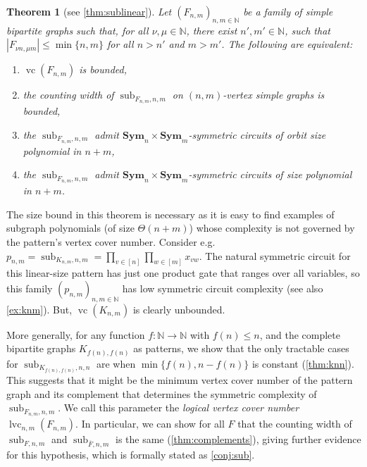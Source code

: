 \documentclass[11pt, DIV=15]{scrarticle}
\theoremstyle{definition}
\theoremstyle{plain}
\newtheorem{theorem}[definition]{Theorem}
\theoremstyle{remark}
\DeclareMathOperator{\sub}{sub}
\DeclareMathOperator{\vc}{vc}
\DeclareMathOperator{\cc}{lvc}
\newcommand{\Sym}{\mathbf{Sym}}
\newcommand{\bbN}{\mathbb{N}}
\begin{document}
\begin{theorem}[see \cref{thm:sublinear}]\label{thm:sublinear-intro}
	Let $(F_{n,m})_{n,m \in \mathbb{N}}$ be a family of simple bipartite graphs such that, 
	for all $\nu, \mu \in \mathbb{N}$,
	there exist $n',m' \in \mathbb{N}$,
	such that $|F_{\nu n, \mu m}| \leq \min \{n,m\}$ for all $n > n'$ and $m > m'$.
	The following are equivalent:
	\begin{enumerate}
		\item $\vc(F_{n,m})$ is bounded,
		\item the counting width of $\sub_{F_{n,m},n,m}$ on $(n,m)$-vertex simple graphs is bounded,
		\item the $\sub_{F_{n,m}, n, m}$ admit $\Sym_n \times \Sym_m$-symmetric circuits of orbit size polynomial in $n+m$,
		\item the $\sub_{F_{n,m}, n, m}$ admit $\Sym_n \times \Sym_m$-symmetric circuits of size polynomial in $n+m$.
	\end{enumerate}
\end{theorem}

The size bound in this theorem is necessary as it is easy to find examples of subgraph polynomials (of size $\Theta(n+m)$) whose complexity is not governed by the pattern's vertex cover number.
Consider e.g.\ $p_{n,m} = \sub_{K_{n,m},n,m} = \prod_{v \in [n]} \prod_{w \in [m]} x_{vw}$.  The natural symmetric circuit for this linear-size pattern has just one product gate that ranges over all variables, so this family $(p_{n,m})_{n,m \in \bbN}$ has low symmetric circuit complexity (see also \cref{ex:knm}). But, $\vc(K_{n,m})$ is clearly unbounded. 

More generally, for any function $f \colon \bbN \to \bbN$ with $f(n) \leq n$, and the complete bipartite graphs $K_{f(n),f(n)}$ as patterns, we  show that the only tractable cases for $\sub_{K_{f(n), f(n)},n,n}$ are when $\min \{ f(n), n-f(n) \}$ is constant (\cref{thm:knn}). This suggests that it might be the minimum vertex cover number of the pattern graph and its complement that determines the symmetric complexity of $\sub_{F_{n,m},n,m}$. We call this parameter the \emph{logical vertex cover number} $\cc_{n,m}(F_{n,m})$.
In particular, we can show for all $F$ that the counting width of $\sub_{F,n,m}$ and $\sub_{\overline{F},n,m}$ is the same (\cref{thm:complements}), giving further evidence for this hypothesis,
which is formally stated as \cref{conj:sub}.
\end{document}
